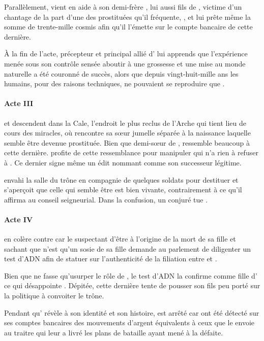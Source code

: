Parallèlement, \elena{} vient en aide à son demi-frère \vladimir{}, lui aussi fils de \reine{}, victime d’un chantage de la part d’une des prostituées qu’il fréquente, \catin, et lui prête même la somme de trente-mille cosmis afin qu’il l’émette sur le compte bancaire de cette dernière.

À la fin de l’acte, \alexas{} précepteur et principal allié d’\elena{} lui apprends que l’expérience menée sous son contrôle sensée aboutir à une grossesse et une mise au monde naturelle a été couronné de succès, alors que depuis vingt-huit-mille ans les humains, pour des raisons techniques, ne pouvaient se reproduire que .


\paragraph{Acte III}
\elena{} et \alexas{} descendent dans la Cale, l’endroit le plus reclus de l’Arche qui tient lieu de cours des miracles, où \elena{} rencontre \ela{} sa sœur jumelle séparée à la naissance laquelle semble être devenue prostituée. Bien que demi-sœur de \princesse{}, \ela{} ressemble beaucoup à cette dernière. \elena{} profite de cette ressemblance pour manipuler \roi{} qui n’a rien à refuser à \ela{}. Ce dernier signe même un édit nommant \elena{} comme son successeur légitime.

\general{} envahi la salle du trône en compagnie de quelques soldats pour destituer \roi{} et s’aperçoit que celle qui semble être \princesse{} est bien vivante, contrairement à ce qu’il affirma au conseil seigneurial. Dans la confusion, un conjuré tue \general{}.

\paragraph{Acte IV}
\reine{} en colère contre \elena{} car le suspectant d’être à l’origine de la mort de sa fille et sachant que \ela{} n’est qu’un sosie de sa fille \princesse{} demande au parlement de diligenter un test d’ADN afin de statuer sur l’authenticité de la filiation entre \roi{} et \ela{}.

Bien que \ela{} ne fasse qu’usurper le rôle de \princesse{}, le test d’ADN la confirme comme fille d’\roi{} ce qui désappointe \reine. Dépitée, cette dernière tente de pousser son fils \vladimir{} peu porté sur la politique à convoiter le trône.

Pendant qu’\elena{} révèle à \ela{} son identité et son histoire, \vladimir{} est arrêté car ont été détecté sur ses comptes bancaires des mouvements d’argent équivalents à ceux que le \campoppose{} envoie au traitre qui leur a livré les plans de bataille ayant mené à la défaite.

